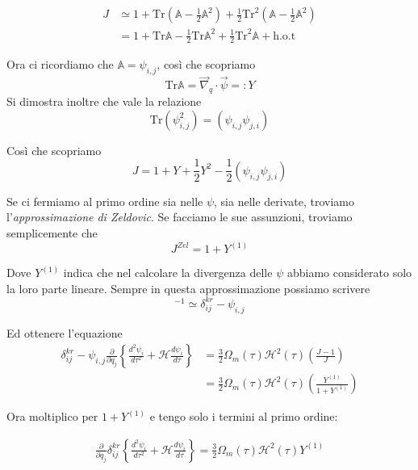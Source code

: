 \documentclass{report}
\begin{document}
\begin{align}
    J &\simeq 1 + \text{Tr}\left( \mathbb{A} - \frac{1}{2}\mathbb{A}^2\right) +\frac{1}{2}\text{Tr}^2\left( \mathbb{A} - \frac{1}{2}\mathbb{A}^2\right) \\
    &= 1 + \text{Tr}\mathbb{A} - \frac{1}{2}\text{Tr}\mathbb{A}^2 + \frac{1}{2}\text{Tr}^2\mathbb{A} + \text{h.o.t}
\end{align}

Ora ci ricordiamo che $\mathbb{A} = \psi_{i,j}$, così che scopriamo 
\begin{equation}
    \text{Tr}\mathbb{A} = \vec{\nabla}_q \cdot \vec{\psi} =: Y
\end{equation}
Si dimostra inoltre che vale la relazione 
\begin{equation}
    \text{Tr}(\psi_{i,j}^2) = (\psi_{i,j}\psi_{j,i})
\end{equation}

Così che scopriamo 
\begin{equation}
    J = 1 + Y +\frac{1}{2}Y^2 - \frac{1}{2}(\psi_{i,j}\psi_{j,i})
\end{equation}

Se ci fermiamo al primo ordine sia nelle $\psi$, sia nelle derivate, troviamo l'\emph{approssimazione di Zeldovic}. 
Se facciamo le sue assunzioni, troviamo semplicemente che 
\begin{equation}
    J^{Zel} = 1 + Y^{(1)}
\end{equation}

Dove $Y^{(1)}$ indica che nel calcolare la divergenza delle $\psi$ abbiamo considerato solo la loro parte lineare. Sempre in questa approssimazione possiamo scrivere 
\begin{equation}
    [\delta^{kr}_{ij} + \psi_{i,j}]^{-1} \simeq \delta_{ij}^{kr} - \psi_{i,j}
\end{equation}

Ed ottenere l'equazione 
\begin{align}
\delta^{kr}_{ij} - \psi_{i, j}\frac{\partial }{\partial q_j}\left\{\frac{d^2 \psi_i}{d\tau^2}  + \mathcal{H}\frac{d\psi_i}{d\tau}\right\} &= \frac{3}{2}\Omega_m(\tau)\mathcal{H}^2(\tau)\left(\frac{J-1}{J}\right) \\ &= \frac{3}{2}\Omega_m(\tau)\mathcal{H}^2(\tau)\left(\frac{Y^{(1)}}{1+Y^{(1)}}\right) 
\end{align}

Ora moltiplico per $1+Y^{(1)}$ e tengo solo i termini al primo ordine: 

\begin{align}
    \frac{\partial }{\partial q_j}\delta^{kr}_{ij}\left\{\frac{d^2 \psi_i}{d\tau^2}  + \mathcal{H}\frac{d\psi_i}{d\tau}\right\} = \frac{3}{2}\Omega_m(\tau)\mathcal{H}^2(\tau)Y^{(1)}
\end{align}
\end{document}
